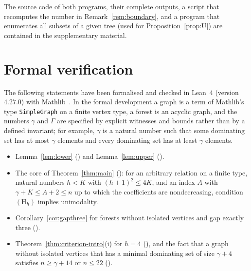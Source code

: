\begin{table}[ht]
\centering
\caption{Numbers $r_n$ of rooted trees generated by Program~I and numbers
$t_n$ of trees examined by both programs.}\label{tab:counts}
\smallskip

\end{table}

The source code of both programs, their complete outputs, a script that
recomputes the number in Remark~\ref{rem:boundary}, and a program that
enumerates all subsets of a given tree (used for
Proposition~\ref{prop:U}) are contained in the supplementary material.

\section{Formal verification}\label{app:lean}

The following statements have been formalised and checked in
Lean~4 (version 4.27.0) with Mathlib~\cite{Lean,Mathlib}. In the formal
development a graph is a term of Mathlib's type \texttt{SimpleGraph} on a
finite vertex type, a forest is an acyclic graph, and the numbers $\gamma$
and $\Gamma$ are specified by explicit witnesses and bounds rather than by a
defined invariant; for example, $\gamma$ is a natural number such that some
dominating set has at most $\gamma$ elements and every dominating set has at
least $\gamma$ elements.

\begin{itemize}
\item Lemma~\ref{lem:lower}
() and Lemma~\ref{lem:upper}
().
\item The core of Theorem~\ref{thm:main}
(): for an arbitrary relation on a
finite type, natural numbers $h<K$ with $(h+1)^2\le4K$, and an index $A$ with
$\gamma+K\le A+2\le n$ up to which the coefficients are nondecreasing,
condition $(\mathrm{H}_h)$ implies unimodality.
\item Corollary~\ref{cor:gapthree} for forests without isolated vertices and
gap exactly three ().
\item Theorem~\ref{thm:criterion-intro}(i) for $h=4$
(), and the fact that a graph
without isolated vertices that has a minimal dominating set of size
$\gamma+4$ satisfies $n\ge\gamma+14$ or $n\le22$
().
\end{itemize}


